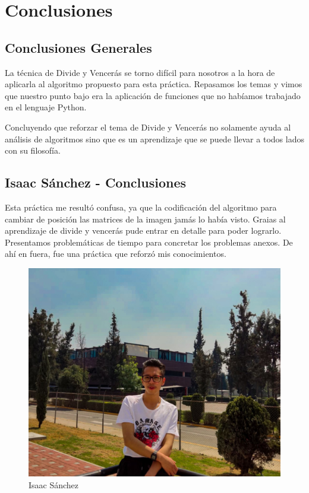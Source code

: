 \chapter{Conclusiones}

\section{Conclusiones Generales}
    
    La técnica de Divide y Vencerás se torno difícil para nosotros a la hora de aplicarla al algoritmo propuesto para esta práctica. Repasamos los temas y vimos que nuestro punto bajo era la aplicación de funciones que no habíamos trabajado en el lenguaje Python. 

    Concluyendo que reforzar el tema de Divide y Vencerás no solamente ayuda al análisis de algoritmos sino que es un aprendizaje que se puede llevar a todos lados con su filosofía. 

\newpage
\section{Isaac Sánchez - Conclusiones}
    Esta práctica me resultó confusa, ya que la codificación del algoritmo para cambiar de posición las matrices de la imagen jamás lo había visto. Graias al aprendizaje de divide y vencerás pude entrar en detalle para poder lograrlo. Presentamos problemáticas de tiempo para concretar los problemas anexos. De ahí en fuera, fue una práctica que reforzó mis conocimientos.
    \begin{figure}[htp!]
            \centering
            \includegraphics[width=1 \textwidth]{Images/Fotos_Alumnos/274612600_2528992867236334_6677874837890685705_n.jpg}  
            \caption{Isaac Sánchez}
            \label{fig:my_label1}
        \end{figure}
    


